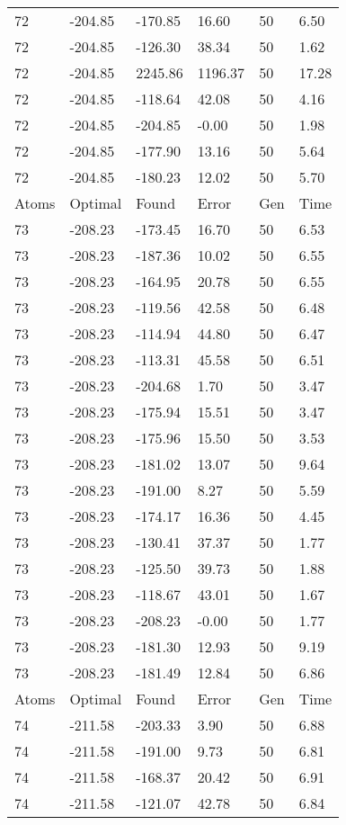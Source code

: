 \documentclass{report}
\begin{document}
\begin{appendix}
\begin{longtable}{llllll}
72 & -204.85 & -170.85 & 16.60 & 50 & 6.50 \\
72 & -204.85 & -126.30 & 38.34 & 50 & 1.62 \\
72 & -204.85 & 2245.86 & 1196.37 & 50 & 17.28 \\
72 & -204.85 & -118.64 & 42.08 & 50 & 4.16 \\
72 & -204.85 & -204.85 & -0.00 & 50 & 1.98 \\
72 & -204.85 & -177.90 & 13.16 & 50 & 5.64 \\
72 & -204.85 & -180.23 & 12.02 & 50 & 5.70 \\
Atoms & Optimal & Found & Error & Gen & Time \\
73 & -208.23 & -173.45 & 16.70 & 50 & 6.53 \\
73 & -208.23 & -187.36 & 10.02 & 50 & 6.55 \\
73 & -208.23 & -164.95 & 20.78 & 50 & 6.55 \\
73 & -208.23 & -119.56 & 42.58 & 50 & 6.48 \\
73 & -208.23 & -114.94 & 44.80 & 50 & 6.47 \\
73 & -208.23 & -113.31 & 45.58 & 50 & 6.51 \\
73 & -208.23 & -204.68 & 1.70 & 50 & 3.47 \\
73 & -208.23 & -175.94 & 15.51 & 50 & 3.47 \\
73 & -208.23 & -175.96 & 15.50 & 50 & 3.53 \\
73 & -208.23 & -181.02 & 13.07 & 50 & 9.64 \\
73 & -208.23 & -191.00 & 8.27 & 50 & 5.59 \\
73 & -208.23 & -174.17 & 16.36 & 50 & 4.45 \\
73 & -208.23 & -130.41 & 37.37 & 50 & 1.77 \\
73 & -208.23 & -125.50 & 39.73 & 50 & 1.88 \\
73 & -208.23 & -118.67 & 43.01 & 50 & 1.67 \\
73 & -208.23 & -208.23 & -0.00 & 50 & 1.77 \\
73 & -208.23 & -181.30 & 12.93 & 50 & 9.19 \\
73 & -208.23 & -181.49 & 12.84 & 50 & 6.86 \\
Atoms & Optimal & Found & Error & Gen & Time \\
74 & -211.58 & -203.33 & 3.90 & 50 & 6.88 \\
74 & -211.58 & -191.00 & 9.73 & 50 & 6.81 \\
74 & -211.58 & -168.37 & 20.42 & 50 & 6.91 \\
74 & -211.58 & -121.07 & 42.78 & 50 & 6.84 \\

\end{longtable}
\end{appendix}
\end{document}
